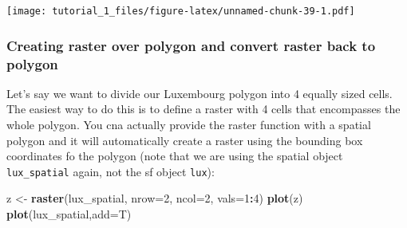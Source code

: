 \documentclass[]{article}
\newenvironment{Shaded}{\begin{snugshade}}{\end{snugshade}}
\newcommand{\DataTypeTok}[1]{\textcolor[rgb]{0.13,0.29,0.53}{#1}}
\newcommand{\DecValTok}[1]{\textcolor[rgb]{0.00,0.00,0.81}{#1}}
\newcommand{\KeywordTok}[1]{\textcolor[rgb]{0.13,0.29,0.53}{\textbf{#1}}}
\newcommand{\NormalTok}[1]{#1}
\newcommand{\OperatorTok}[1]{\textcolor[rgb]{0.81,0.36,0.00}{\textbf{#1}}}
\newcommand{\StringTok}[1]{\textcolor[rgb]{0.31,0.60,0.02}{#1}}
\begin{document}
\begin{Shaded}
\end{Shaded}

\texttt{[image: tutorial\_1\_files/figure-latex/unnamed-chunk-39-1.pdf]}

\hypertarget{creating-raster-over-polygon-and-convert-raster-back-to-polygon}{%
\subsubsection{Creating raster over polygon and convert raster back to
polygon}\label{creating-raster-over-polygon-and-convert-raster-back-to-polygon}}

Let's say we want to divide our Luxembourg polygon into 4 equally sized
cells. The easiest way to do this is to define a raster with 4 cells
that encompasses the whole polygon. You cna actually provide the raster
function with a spatial polygon and it will automatically create a
raster using the bounding box coordinates fo the polygon (note that we
are using the spatial object \texttt{lux\_spatial} again, not the sf
object \texttt{lux}):

\begin{Shaded}
\begin{Highlighting}[]
\NormalTok{z <-}\StringTok{ }\KeywordTok{raster}\NormalTok{(lux_spatial, }\DataTypeTok{nrow=}\DecValTok{2}\NormalTok{, }\DataTypeTok{ncol=}\DecValTok{2}\NormalTok{, }\DataTypeTok{vals=}\DecValTok{1}\OperatorTok{:}\DecValTok{4}\NormalTok{)}
\KeywordTok{plot}\NormalTok{(z)}
\KeywordTok{plot}\NormalTok{(lux_spatial,}\DataTypeTok{add=}\NormalTok{T)}
\end{Highlighting}
\end{Shaded}
\end{document}
